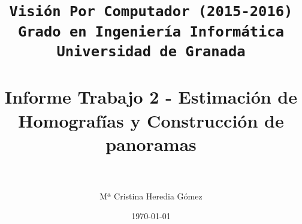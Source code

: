 


\title{
\normalfont \normalsize
\texttt{{\bf Visión Por Computador (2015-2016)} \\ Grado en Ingeniería Informática \\ Universidad de Granada} \\ [25pt] %
\horrule{0.5pt} \\[0.4cm] %
\huge Informe Trabajo 2 - Estimación de Homografías y Construcción de panoramas \\ %
\horrule{2pt} \\[0.5cm] %
}

\author{Mª Cristina Heredia Gómez} %

\date{\normalsize\today} %




\maketitle %

\newpage %

\tableofcontents %

\listoffigures


\newpage



\newpage

